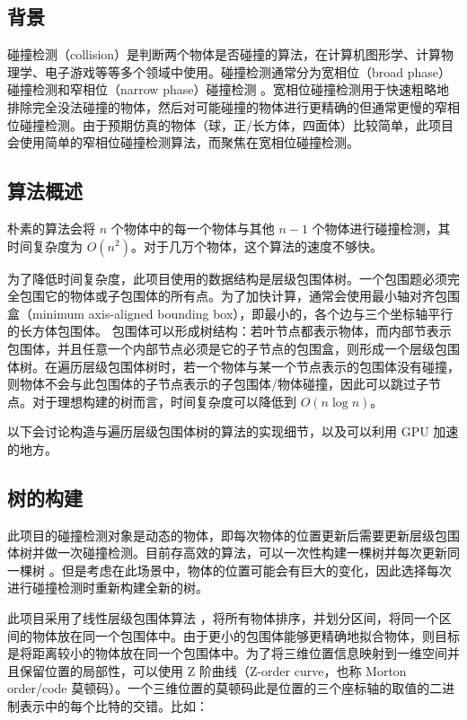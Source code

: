\subsection{背景}

碰撞检测（collision）是判断两个物体是否碰撞的算法，在计算机图形学、计算物理学、电子游戏等等多个领域中使用。碰撞检测通常分为宽相位（broad phase）碰撞检测和窄相位（narrow phase）碰撞检测 \cite{nvidiaCollisionDetection}。宽相位碰撞检测用于快速粗略地排除完全没法碰撞的物体，然后对可能碰撞的物体进行更精确的但通常更慢的窄相位碰撞检测。由于预期仿真的物体（球，正/长方体，四面体）比较简单，此项目会使用简单的窄相位碰撞检测算法，而聚焦在宽相位碰撞检测。

\subsection{算法概述}

朴素的算法会将 $n$ 个物体中的每一个物体与其他 $n-1$ 个物体进行碰撞检测，其时间复杂度为 $O(n^2)$。对于几万个物体，这个算法的速度不够快。

为了降低时间复杂度，此项目使用的数据结构是层级包围体树。一个包围题必须完全包围它的物体或子包围体的所有点。为了加快计算，通常会使用最小轴对齐包围盒（minimum axis-aligned bounding box），即最小的，各个边与三个坐标轴平行的长方体包围体。
包围体可以形成树结构：若叶节点都表示物体，而内部节表示包围体，并且任意一个内部节点必须是它的子节点的包围盒，则形成一个层级包围体树。在遍历层级包围体树时，若一个物体与某一个节点表示的包围体没有碰撞，则物体不会与此包围体的子节点表示的子包围体/物体碰撞，因此可以跳过子节点。对于理想构建的树而言，时间复杂度可以降低到 $O(n\log n)$。

以下会讨论构造与遍历层级包围体树的算法的实现细节，以及可以利用 GPU 加速的地方。

\subsection{树的构建}

此项目的碰撞检测对象是动态的物体，即每次物体的位置更新后需要更新层级包围体树并做一次碰撞检测。目前存高效的算法，可以一次性构建一棵树并每次更新同一棵树 \cite{Wald2008}。但是考虑在此场景中，物体的位置可能会有巨大的变化，因此选择每次进行碰撞检测时重新构建全新的树。

此项目采用了线性层级包围体算法 \cite{nvidiaTreeConstruction} \cite{Lauterbach2009}，将所有物体排序，并划分区间，将同一个区间的物体放在同一个包围体中。由于更小的包围体能够更精确地拟合物体，则目标是将距离较小的物体放在同一个包围体中。为了将三维位置信息映射到一维空间并且保留位置的局部性，可以使用 Z 阶曲线（Z-order curve，也称 Morton order/code 莫顿码）\cite{wikipediaZorderCurve}。一个三维位置的莫顿码此是位置的三个座标轴的取值的二进制表示中的每个比特的交错。比如：

